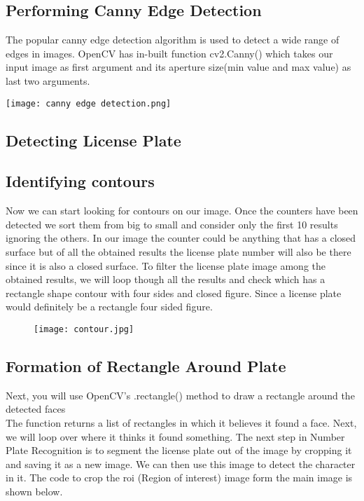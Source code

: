 \documentclass[12pt,a4paper]{report}
\begin{document}
\subsection{Performing Canny Edge Detection}
The popular canny edge detection algorithm is used to detect a wide range of edges in images. OpenCV has in-built function cv2.Canny() which takes our input image as first argument and its aperture size(min value and max value) as last two arguments.

\texttt{[image: canny edge detection.png]}
\begin{figure}[h!]
\caption{}
\end{figure}


\subsection{Detecting License Plate}
\subsection{Identifying contours}
Now we can start looking for contours on our image. Once the counters have been detected we sort them from big to small and consider only the first 10 results ignoring the others. In our image the counter could be anything that has a closed surface but of all the obtained results the license plate number will also be there since it is also a closed surface. To filter the license plate image among the obtained results, we will loop though all the results and check which has a rectangle shape contour with four sides and closed figure. Since a license plate would definitely be a rectangle four sided figure.


\begin{figure}[h!]
\texttt{[image: contour.jpg]}
\caption{}
\end{figure}

\subsection{Formation of Rectangle Around Plate}
Next, you will use OpenCV’s .rectangle() method to draw a rectangle around the detected faces\\
The function returns a list of rectangles in which it believes it found a face. Next, we will loop over where it thinks it found something.
The next step in Number Plate Recognition is to segment the license plate out of the image by cropping it and saving it as a new image. We can then use this image to detect the character in it. The code to crop the roi (Region of interest) image form the main image is shown below.
\end{document}
